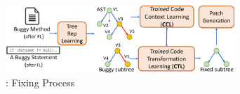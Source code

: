 

\begin{figure}[t]
	\centering
	\includegraphics[width=3.4in]{graphs/overview-predict-2.png}
	\caption{{\tool}: Fixing Process}
        \vspace{-3pt}
	\label{overview-fixing}
\end{figure}
